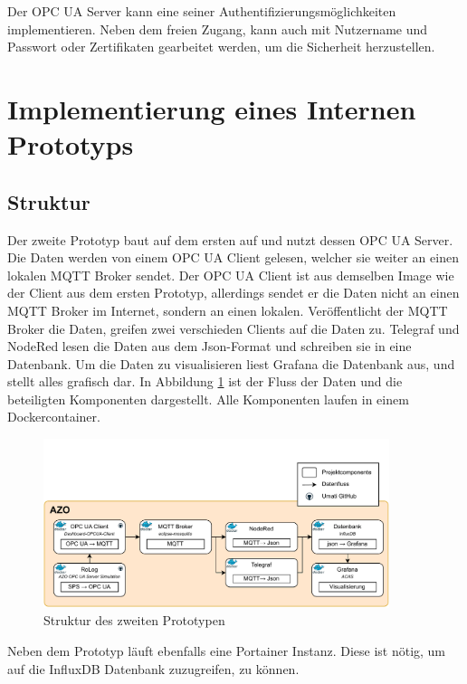 \documentclass[a4paper, 12pt, oneside, toc=listofnumbered, bibliography=totoc]{scrbook}
\begin{document}
		Der OPC UA Server kann eine seiner Authentifizierungsmöglichkeiten implementieren. Neben dem freien Zugang, kann auch mit Nutzername und Passwort oder Zertifikaten gearbeitet werden, um die Sicherheit herzustellen. 
	
	\section{Implementierung eines Internen Prototyps}\label{ch:Implementierung-Intern}
	
		\subsection{Struktur}
		
		Der zweite Prototyp baut auf dem ersten auf und nutzt dessen OPC UA Server. Die Daten werden von einem OPC UA Client gelesen, welcher sie weiter an einen lokalen MQTT Broker sendet. Der OPC UA Client ist aus demselben Image wie der Client aus dem ersten Prototyp, allerdings sendet er die Daten nicht an einen MQTT Broker im Internet, sondern an einen lokalen. Veröffentlicht der MQTT Broker die Daten, greifen zwei verschieden Clients auf die Daten zu. Telegraf und NodeRed lesen die Daten aus dem Json-Format und schreiben sie in eine Datenbank. Um die Daten zu visualisieren liest Grafana die Datenbank aus, und stellt alles grafisch dar. In Abbildung \ref{fig:Prototyp2} ist der Fluss der Daten und die beteiligten Komponenten dargestellt. Alle Komponenten laufen in einem Dockercontainer.
		
		\begin{figure}[H]
			\centering
			\includegraphics[width=0.9\textwidth]{res/implementierung/Prototyp-Prototyp.pdf}
			\caption{Struktur des zweiten Prototypen}
			\label{fig:Prototyp2}
		\end{figure}
		
		Neben dem Prototyp läuft ebenfalls eine Portainer Instanz. Diese ist nötig, um auf die InfluxDB Datenbank zuzugreifen, zu können. 
		
\end{document}
